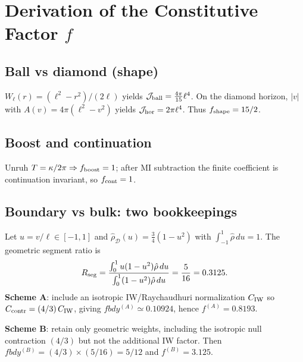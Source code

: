 \documentclass[aps,prd,onecolumn,superscriptaddress,nofootinbib]{revtex4-2}
\def\fbdy{fbdy}%
\newcommand{\fbdy}{f_{\rm bdy}}
\begin{document}
\section{Derivation of the Constitutive Factor $f$}
\label{app:f-normalization}
\subsection{Ball vs diamond (shape)}
$W_\ell(r)=(\ell^2-r^2)/(2\ell)$ yields $\mathcal J_{\rm ball}=\frac{4\pi}{15}\ell^4$.
On the diamond horizon, $|v|$ with $A(v)=4\pi(\ell^2-v^2)$ yields $\mathcal J_{\rm hor}=2\pi\ell^4$.
Thus $f_{\rm shape}=15/2$.

\subsection{Boost and continuation}
Unruh $T=\kappa/2\pi\Rightarrow f_{\rm boost}=1$; after MI subtraction the finite coefficient is continuation invariant, so $f_{\rm cont}=1$.

\subsection{Boundary vs bulk: two bookkeepings}
\label{app:fbdy-derivation}
Let $u=v/\ell\in[-1,1]$ and $\hat\rho_{\mathcal D}(u)=\tfrac{3}{4}(1-u^2)$ with $\int_{-1}^1\hat\rho\,du=1$.
The geometric segment ratio is
\[
R_{\rm seg}=
\frac{\int_{0}^{1} u(1-u^2)\hat\rho\,du}{\int_{0}^{1} (1-u^2)\hat\rho\,du}
=\frac{5}{16}=0.3125.
\]
\textbf{Scheme A}: include an isotropic IW/Raychaudhuri normalization $C_{\rm IW}$ so $C_{\rm contr}=({4}/{3})\,C_{\rm IW}$, giving $\fbdy^{(A)}\simeq0.10924$, hence $f^{(A)}=0.8193$.

\textbf{Scheme B}: retain only geometric weights, including the isotropic null contraction $(4/3)$ but not the additional IW factor. Then $\fbdy^{(B)}=(4/3)\times (5/16)=5/12$ and $f^{(B)}=3.125$.
\end{document}
